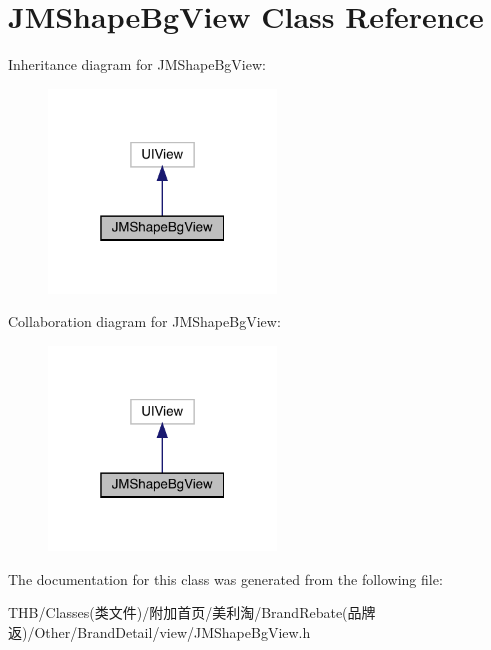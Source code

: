 \hypertarget{interface_j_m_shape_bg_view}{}\section{J\+M\+Shape\+Bg\+View Class Reference}
\label{interface_j_m_shape_bg_view}


Inheritance diagram for J\+M\+Shape\+Bg\+View\+:\nopagebreak
\begin{figure}[H]
\begin{center}
\leavevmode
\includegraphics[width=172pt]{interface_j_m_shape_bg_view__inherit__graph}
\end{center}
\end{figure}


Collaboration diagram for J\+M\+Shape\+Bg\+View\+:\nopagebreak
\begin{figure}[H]
\begin{center}
\leavevmode
\includegraphics[width=172pt]{interface_j_m_shape_bg_view__coll__graph}
\end{center}
\end{figure}


The documentation for this class was generated from the following file\+:\begin{DoxyCompactItemize}
\item 
T\+H\+B/\+Classes(类文件)/附加首页/美利淘/\+Brand\+Rebate(品牌返)/\+Other/\+Brand\+Detail/view/J\+M\+Shape\+Bg\+View.\+h\end{DoxyCompactItemize}
